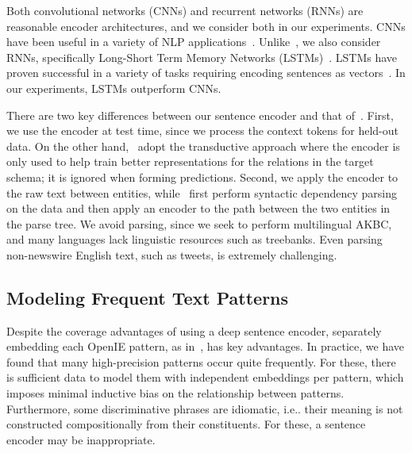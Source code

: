 Both convolutional networks (CNNs) and recurrent networks (RNNs) are reasonable encoder architectures, and we consider both in our experiments. CNNs have been useful in a variety of NLP applications~\citep{collobert2011natural,KalchbrennerACL2014,kim2014convolutional}. Unlike~\citet{toutanova2015representing}, we also consider RNNs, specifically Long-Short Term Memory Networks (LSTMs)~\citep{lstm}. LSTMs have proven successful in a variety of tasks requiring encoding sentences as vectors~\citep{rnnmt,rnnparse}. In our experiments, LSTMs outperform CNNs.

There are two key differences between our sentence encoder and that of~\citet{toutanova2015representing}.  First, we use the encoder at test time, since we process the context tokens for held-out data. On the other hand,~\citet{toutanova2015representing} adopt the transductive approach where the encoder is only used to help train better representations for the relations in the target schema; it is ignored when forming predictions.  Second, we apply the encoder to the raw text between entities, while~\citet{toutanova2015representing} first perform syntactic dependency parsing on the data and then apply an encoder to the path between the two entities in the parse tree. We avoid parsing, since we seek to perform multilingual AKBC, and many languages lack linguistic resources such as treebanks. Even parsing non-newswire English text, such as tweets, is extremely challenging. %


\subsection{Modeling Frequent Text Patterns}
\label{sec:non-comp}

Despite the coverage advantages of using a deep sentence encoder, separately embedding each OpenIE pattern, as in~\citet{limin}, has key advantages. In practice, we have found that many high-precision patterns occur quite frequently. For these, there is sufficient data to model them with independent embeddings per pattern, which imposes minimal inductive bias on the relationship between patterns. Furthermore, some discriminative phrases are idiomatic, i.e.. their meaning is not constructed compositionally from their constituents. For these, a sentence encoder may be inappropriate.


